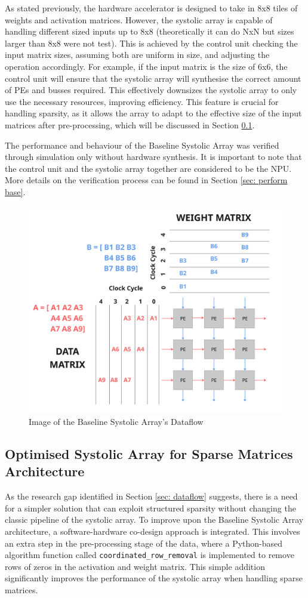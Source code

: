 \documentclass[12pt, a4paper, ukenglish]{article}
\newcommand{\baselineDataflowImage}{
    \begin{figure}[ht]
        \centering
        \includegraphics[width=0.5\linewidth]{figures/baseline_systolic_array_dataflow.jpg}
        \caption{Image of the Baseline Systolic Array's Dataflow}
        \label{fig:baseline_dataflow}
    \end{figure}
}
\begin{document}
    As stated previously, the hardware accelerator is designed to take in 8x8 tiles of weights and activation matrices. However, the systolic array is capable of handling different sized inputs up to 8x8 (theoretically it can do NxN but sizes larger than 8x8 were not test). This is achieved by the control unit checking the input matrix sizes, assuming both are uniform in size, and adjusting the operation accordingly. For example, if the input matrix is the size of 6x6, the control unit will ensure that the systolic array will synthesise the correct amount of PEs and busses required. This effectively downsizes the systolic array to only use the necessary resources, improving efficiency. This feature is crucial for handling sparsity, as it allows the array to adapt to the effective size of the input matrices after pre-processing, which will be discussed in Section \ref{sec: handling algo}.

    The performance and behaviour of the Baseline Systolic Array was verified through simulation only without hardware synthesis. It is important to note that the control unit and the systolic array together are considered to be the NPU. More details on the verification process can be found in Section \ref{sec: perform base}.

    \baselineDataflowImage

    \subsection{Optimised Systolic Array for Sparse Matrices Architecture} \label{sec: handling algo}
    As the research gap identified in Section \ref{sec: dataflow} suggests, there is a need for a simpler solution that can exploit structured sparsity without changing the classic pipeline of the systolic array. To improve upon the Baseline Systolic Array architecture, a software-hardware co-design approach is integrated. This involves an extra step in the pre-processing stage of the data, where a Python-based algorithm function called \texttt{coordinated\_row\_removal} is implemented to remove rows of zeros in the activation and weight matrix. This simple addition significantly improves the performance of the systolic array when handling sparse matrices.
\end{document}
